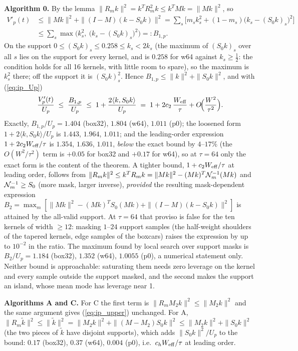 \documentclass{article}
\numberwithin{equation}{section}   %
\def\nn{\nonumber}
\begin{document}
{\bf Algorithm 0.}  By the lemma $\|R_m k\|^2 = k^TR_m^2k \le k^TMk = \|Mk\|^2$, so
\begin{align}
V'_p(t) &\le \|Mk\|^2 + \|(I - M)(k - S_0 k)\|^2 = \sum_s \Big[ m_s k_s^2 + (1 - m_s)\big(k_s - (S_0k)_s\big)^2 \Big] \nn \\
   &\le \sum_s \max\!\Big( k_s^2,\ \big(k_s - (S_0k)_s\big)^2 \Big) =: B_{1,p} .
\label{eq:ip_B1}
\end{align}
On the support $0 \le (S_0k)_s \le 0.258 \le k_s < 2k_s$ (the maximum of $(S_0k)_s$ over all $s$ lies on
the support for every kernel, and is $0.258$ for w64 against $k_s \ge \tfrac12$: the condition holds for
all 16 kernels, with little room to spare), so the maximum is $k_s^2$ there; off the support it is
$(S_0k)_s^2$.  Hence $B_{1,p} \le \|k\|^2 + \|S_0k\|^2$, and with (\ref{eq:ip_Up})
\begin{equation}
\frac{V'_p(t)}{U_p} \;\le\; \frac{B_{1,p}}{U_p} \;\le\; 1 + \frac{2\langle k, S_0k\rangle}{U_p} \;=\; 1 + 2c_2\,\frac{W_{\rm eff}}{\tau} + O\!\Big(\frac{W^2}{\tau^2}\Big) .
\label{eq:ip_upper}
\end{equation}
Exactly, $B_{1,p}/U_p = 1.404$ (box32), $1.804$ (w64), $1.011$ (p0); the loosened form
$1 + 2\langle k, S_0k\rangle/U_p$ is $1.443$, $1.964$, $1.011$; and the leading-order expression
$1 + 2c_2W_{\rm eff}/\tau$ is $1.354$, $1.636$, $1.011$, {\em below} the exact bound by $4$--$17\%$ (the
$O(W^2/\tau^2)$ term is $+0.05$ for box32 and $+0.17$ for w64), so at $\tau = 64$ only the exact form is
the content of the theorem.  A tighter bound, $1 + c_2 W_{\rm eff}/\tau$ at leading order, follows from
$\|R_mk\|^2 \le k^TR_mk = \|Mk\|^2 - (Mk)^T{\cal N}_m^{-1}(Mk)$ and ${\cal N}_m^{-1} \ge S_0$ (more mask,
larger inverse), {\em provided} the resulting mask-dependent expression
$B_2 = \max_m [\|Mk\|^2 - (Mk)^TS_0(Mk) + \|(I - M)(k - S_0k)\|^2]$ is attained by the all-valid support.
At $\tau = 64$ that proviso is false for the ten kernels of width $\ge 12$: masking $1$--$24$ support
samples (the half-weight shoulders of the tapered kernels, edge samples of the boxcars) raises the
expression by up to $10^{-2}$ in the ratio.  The maximum found by local search over support masks is
$B_2/U_p = 1.184$ (box32), $1.352$ (w64), $1.0055$ (p0), a numerical statement only.  Neither bound is
approachable: saturating them needs zero leverage on the kernel and every sample outside the support
masked, and the second makes the support an island, whose mean mode has leverage near 1.

{\bf Algorithms A and C.}  For C the first term is $\|R_m M_2 k\|^2 \le \|M_2 k\|^2$ and the same
argument gives (\ref{eq:ip_upper}) unchanged.  For A, $\|R_m\tilde k\|^2 \le \|\tilde k\|^2 =
\|M_2k\|^2 + \|(M - M_2)S_0k\|^2 \le \|M_2k\|^2 + \|S_0k\|^2$ (the two pieces of $\tilde k$ have disjoint
supports), which adds $\|S_0k\|^2/U_p$ to the bound: $0.17$ (box32), $0.37$ (w64), $0.004$ (p0), i.e.\
$c_h W_{\rm eff}/\tau$ at leading order.
\end{document}
